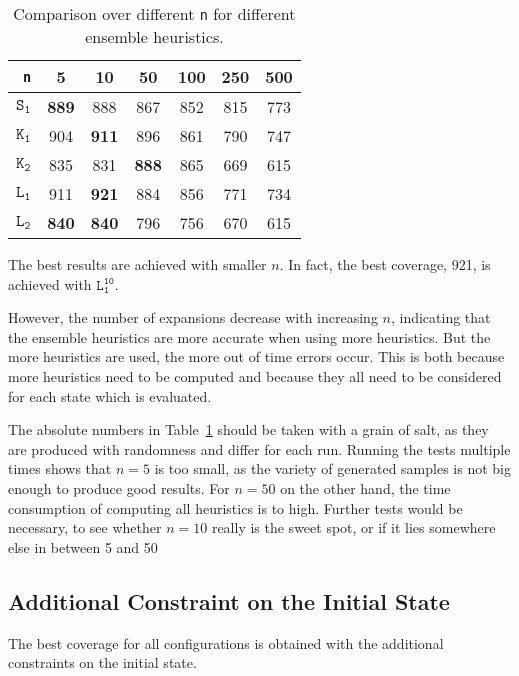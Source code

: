 \begin{table}[h!]
    \begin{center}
        \begin{tabular}{|r|c|c|c|c|c|c|}
            \hline
            \textbf{\texttt{n}} & \textbf{5} & \textbf{10} & \textbf{50} & \textbf{100} & \textbf{250} & \textbf{500} \\
            \hline \hline
            \textbf{$\texttt{S}_\texttt{1}$} & \textbf{889} & 888 & 867 & 852 & 815 & 773 \\ \hline
            \textbf{$\texttt{K}_\texttt{1}$} & 904 & \textbf{911} & 896 & 861 & 790 & 747 \\ \hline
            \textbf{$\texttt{K}_\texttt{2}$} & 835 & 831 & \textbf{888} & 865 & 669 & 615 \\ \hline
            \textbf{$\texttt{L}_\texttt{1}$} & 911 & \textbf{921} & 884 & 856 & 771 & 734 \\ \hline
            \textbf{$\texttt{L}_\texttt{2}$} & \textbf{840} & \textbf{840} & 796 & 756 & 670 & 615 \\ \hline
        \end{tabular}
        \caption{Comparison over different \texttt{n} for different ensemble heuristics.}
        \label{table:ensemble-n}
    \end{center}
\end{table}

The best results are achieved with smaller $n$.
In fact, the best coverage, 921, is achieved with $\texttt{L}_\texttt{1}^\texttt{10}$.

However, the number of expansions decrease with increasing $n$, indicating that the ensemble heuristics are more accurate when using more heuristics.
But the more heuristics are used, the more out of time errors occur.
This is both because more heuristics need to be computed and because they all need to be considered for each state which is evaluated.

The absolute numbers in Table~\ref{table:ensemble-n} should be taken with a grain of salt, as they are produced with randomness and differ for each run.
Running the tests multiple times shows that $n=5$ is too small, as the variety of generated samples is not big enough to produce good results.
For $n=50$ on the other hand, the time consumption of computing all heuristics is to high.
Further tests would be necessary, to see whether $n=10$ really is the sweet spot, or if it lies somewhere else in between 5 and 50
\newpage

\subsection{Additional Constraint on the Initial State}\label{subsec:additional-constraint-on-the-initial-state}
The best coverage for all configurations is obtained with the additional constraints on the initial state.


